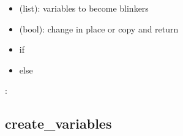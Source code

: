 \documentclass[letterpaper,10pt,english]{sphinxmanual}
\begin{document}
\begin{fulllineitems}
\begin{description}
\begin{itemize}
\item {} 
 (list): variables to become blinkers

\item {} 
 (bool): change  in place or copy and return

\end{itemize}

\item[{\sphinxstylestrong{returns}:}] \leavevmode\begin{itemize}
\item {} 
 if 

\item {} 
 else

\end{itemize}

\end{description}

:

\begin{sphinxVerbatim}[commandchars=\\\{\}]
  \PYG{p}{[} \PYG{p}{]}
 
\end{sphinxVerbatim}

\end{fulllineitems}



\subsection{create\_variables}
\label{\detokenize{PrimeImplicants:id11}}\label{\detokenize{PrimeImplicants:create-variables}}
\end{document}

